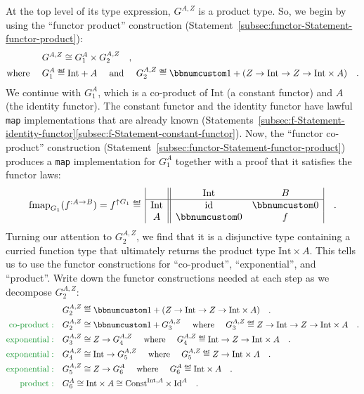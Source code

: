 At the top level of its type expression, $G^{A,Z}$ is a product type.
So, we begin by using the \textsf{``}functor product\textsf{''} construction (Statement~\ref{subsec:functor-Statement-functor-product}):
\begin{align*}
 & G^{A,Z}\cong G_{1}^{A}\times G_{2}^{A,Z}\quad,\\
\text{where }\quad & G_{1}^{A}\triangleq\text{Int}+A\quad\text{ and }\quad G_{2}^{A,Z}\triangleq\bbnum 1+(Z\rightarrow\text{Int}\rightarrow Z\rightarrow\text{Int}\times A)\quad.
\end{align*}
We continue with $G_{1}^{A}$, which is a co-product of $\text{Int}$
(a constant functor) and $A$ (the identity functor). The constant
functor and the identity functor have lawful \lstinline!map! implementations
that are already known (Statements~\ref{subsec:f-Statement-identity-functor}\textendash \ref{subsec:f-Statement-constant-functor}).
Now, the \textsf{``}functor co-product\textsf{''} construction (Statement~\ref{subsec:functor-Statement-functor-product})
produces a \lstinline!map! implementation for $G_{1}^{A}$ together
with a proof that it satisfies the functor laws:
\[
\text{fmap}_{G_{1}}(f^{:A\rightarrow B})=f^{\uparrow G_{1}}\triangleq\,\begin{array}{|c||cc|}
 & \text{Int} & B\\
\hline \text{Int} & \text{id} & \bbnum 0\\
A & \bbnum 0 & f
\end{array}\quad.
\]
Turning our attention to $G_{2}^{A,Z}$, we find that it is a disjunctive
type containing a curried function type that ultimately returns the
product type $\text{Int}\times A$. This tells us to use the functor
constructions for \textsf{``}co-product\textsf{''}, \textsf{``}exponential\textsf{''}, and \textsf{``}product\textsf{''}.
Write down the functor constructions needed at each step as we decompose
$G_{2}^{A,Z}$:
\begin{align*}
 & G_{2}^{A,Z}\triangleq\bbnum 1+(Z\rightarrow\text{Int}\rightarrow Z\rightarrow\text{Int}\times A)\quad.\\
{\color{greenunder}\text{co-product}:}\quad & G_{2}^{A,Z}\cong\bbnum 1+G_{3}^{A,Z}\quad\text{ where }\quad G_{3}^{A,Z}\triangleq Z\rightarrow\text{Int}\rightarrow Z\rightarrow\text{Int}\times A\quad.\\
{\color{greenunder}\text{exponential}:}\quad & G_{3}^{A,Z}\cong Z\rightarrow G_{4}^{A,Z}\quad\text{ where \quad}G_{4}^{A,Z}\triangleq\text{Int}\rightarrow Z\rightarrow\text{Int}\times A\quad.\\
{\color{greenunder}\text{exponential}:}\quad & G_{4}^{A,Z}\cong\text{Int}\rightarrow G_{5}^{A,Z}\quad\text{ where }\quad G_{5}^{A,Z}\triangleq Z\rightarrow\text{Int}\times A\quad.\\
{\color{greenunder}\text{exponential}:}\quad & G_{5}^{A,Z}\cong Z\rightarrow G_{6}^{A}\quad\text{ where }\quad G_{6}^{A}\triangleq\text{Int}\times A\quad.\\
{\color{greenunder}\text{product}:}\quad & G_{6}^{A}\cong\text{Int}\times A\cong\text{Const}^{\text{Int},A}\times\text{Id}^{A}\quad.
\end{align*}
